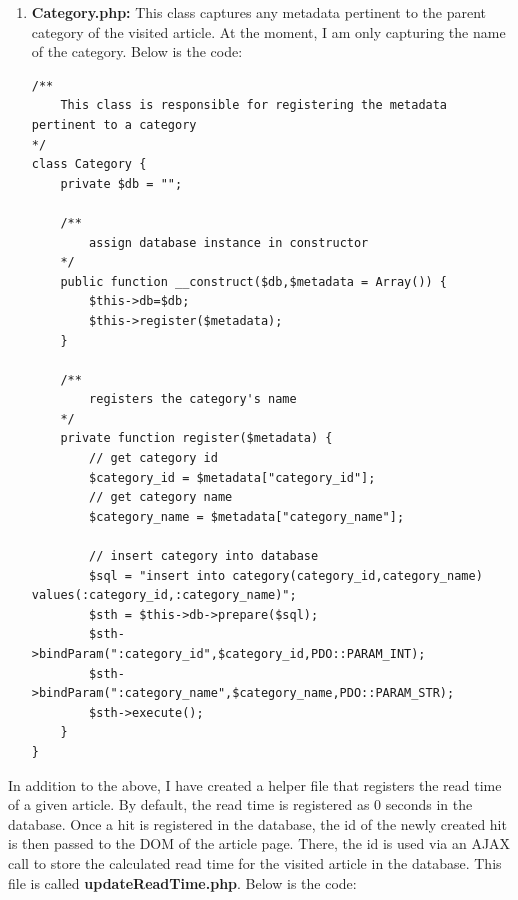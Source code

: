 \documentclass[12pt]{article}
\begin{document}
\begin{enumerate}
\begin{lstlisting}[basicstyle=\tiny]
	/**
		registers the article's title,category,url,sample text, and a sample image
	*/
	private function register($metadata) {
		// get article id
		$article_id = $metadata["article_id"];
		
		// insert the article metadata into the database
		$category_id = $metadata["category_id"];
		$article_url = $metadata["url"];
		$title = $metadata["title"];
		$sample_text = $metadata["sample_text"];
		$sample_pic = $metadata["sample_pic"];
		$sql = "insert into article(article_id,category_id,article_url,title,sample_text,sample_pic) values (:article_id,:category_id,:article_url,:title,:sample_text,:sample_pic)";
		$sth = $this->db->prepare($sql);
		$sth->bindParam(":article_id",$article_id,PDO::PARAM_INT);
		$sth->bindParam(":category_id",$category_id,PDO::PARAM_INT);
		$sth->bindParam(":article_url",$article_url,PDO::PARAM_STR);
		$sth->bindParam(":title",$title,PDO::PARAM_STR);
		$sth->bindParam(":sample_text",$sample_text,PDO::PARAM_STR);
		$sth->bindParam(":sample_pic",$sample_pic,PDO::PARAM_STR);
		$sth->execute();
	}
}
\end{lstlisting} 
\vfill
\item{\textbf{Category.php:}} This class captures any metadata pertinent to the parent category of the visited article. At the moment, I am only capturing the name of the category. Below is the code:
\begin{lstlisting}[basicstyle=\tiny]
/**
	This class is responsible for registering the metadata pertinent to a category
*/
class Category {
	private $db = "";
	
	/**
		assign database instance in constructor
	*/
	public function __construct($db,$metadata = Array()) {
		$this->db=$db;
		$this->register($metadata);
	}
	
	/**
		registers the category's name
	*/
	private function register($metadata) {
		// get category id
		$category_id = $metadata["category_id"];
		// get category name
		$category_name = $metadata["category_name"];
		
		// insert category into database
		$sql = "insert into category(category_id,category_name) values(:category_id,:category_name)";
		$sth = $this->db->prepare($sql);
		$sth->bindParam(":category_id",$category_id,PDO::PARAM_INT);
		$sth->bindParam(":category_name",$category_name,PDO::PARAM_STR);
		$sth->execute();
	}
}
\end{lstlisting}
\end{enumerate}
\vfill

In addition to the above, I have created a helper file that registers the read time of a given article. By default, the read time is registered as 0 seconds in the database. Once a hit is registered in the database, the id of the newly created hit is then passed to the DOM of the article page. There, the id is used via an AJAX call to store the calculated read time for the visited article in the database. This file is called \textbf{updateReadTime.php}. Below is the code:
\end{document}
